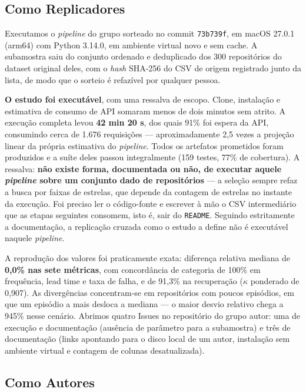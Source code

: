 \subsection{Como Replicadores}

Executamos o \emph{pipeline} do grupo sorteado no commit \texttt{73b739f}, em macOS 27.0.1
(arm64) com Python 3.14.0, em ambiente virtual novo e sem cache. A subamostra saiu do
conjunto ordenado e deduplicado dos 300 repositórios do dataset original deles, com o
\emph{hash} SHA-256 do CSV de origem registrado junto da lista, de modo que o sorteio é
refazível por qualquer pessoa.

\textbf{O estudo foi executável}, com uma ressalva de escopo. Clone, instalação e estimativa
de consumo de API somaram menos de dois minutos sem atrito. A execução completa levou
\textbf{42 min 20 s}, dos quais 91\% foi espera da API, consumindo cerca de 1.676 requisições
--- aproximadamente 2,5 vezes a projeção linear da própria estimativa do \emph{pipeline}.
Todos os artefatos prometidos foram produzidos e a suíte deles passou integralmente (159
testes, 77\% de cobertura). A ressalva: \textbf{não existe forma, documentada ou não, de
executar aquele \emph{pipeline} sobre um conjunto dado de repositórios} --- a seleção sempre
refaz a busca por faixas de estrelas, que depende da contagem de estrelas no instante da
execução. Foi preciso ler o código-fonte e escrever à mão o CSV intermediário que as etapas
seguintes consomem, isto é, sair do \texttt{README}. Seguindo estritamente a documentação, a
replicação cruzada como o estudo a define não é executável naquele \emph{pipeline}.

A reprodução dos valores foi praticamente exata: diferença relativa mediana de
\textbf{0,0\% nas sete métricas}, com concordância de categoria de 100\% em frequência, lead
time e taxa de falha, e de 91,3\% na recuperação ($\kappa$ ponderado de 0,907). As divergências
concentram-se em repositórios com poucos episódios, em que um episódio a mais desloca a
mediana --- o maior desvio relativo chega a 945\% nesse cenário. Abrimos quatro Issues no
repositório do grupo autor: uma de execução e documentação (ausência de parâmetro para a
subamostra) e três de documentação (links apontando para o disco local de um autor,
instalação sem ambiente virtual e contagem de colunas desatualizada).

\subsection{Como Autores}

